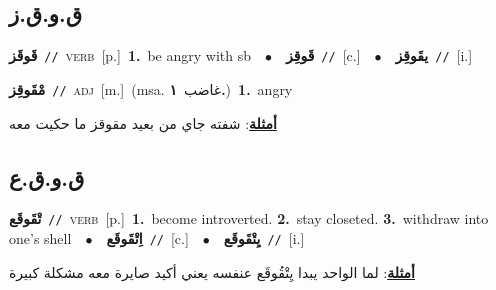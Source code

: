 \documentclass[10pt,a4paper,twoside]{article} %
\begin{document}
\begin{multicols}{2}
\vspace{-3mm}
\subsection*{\color{blue}\foreignlanguage{arabic}{ق.و.ق.ز}\color{blue}{}} 

{\setlength\topsep{0pt}\textbf{\foreignlanguage{arabic}{قَوقَز}}\ {\color{gray}\texttt{//}\color{black}}\ \textsc{verb}\ [p.]\ \textbf{1.}~be angry with sb\ \ $\bullet$\ \ \setlength\topsep{0pt}\textbf{\foreignlanguage{arabic}{قَوقِز}}\ {\color{gray}\texttt{//}\color{black}}\ [c.]\ \ $\bullet$\ \ \setlength\topsep{0pt}\textbf{\foreignlanguage{arabic}{يقَوقِز}}\ {\color{gray}\texttt{//}\color{black}}\ [i.]\ } \vspace{2mm}

{\setlength\topsep{0pt}\textbf{\foreignlanguage{arabic}{مْقَوقِز}}\ {\color{gray}\texttt{//}\color{black}}\ \textsc{adj}\ [m.]\ \color{gray}(msa. \foreignlanguage{arabic}{غاضب}~\foreignlanguage{arabic}{\textbf{١.}})\color{black}\ \textbf{1.}~angry\  \begin{flushright}\color{gray}\foreignlanguage{arabic}{\textbf{\underline{\foreignlanguage{arabic}{أمثلة}}}: شفته جاي من بعيد مقوقز ما حكيت معه}\end{flushright}\color{black}} \vspace{2mm}

\vspace{-3mm}
\subsection*{\color{blue}\foreignlanguage{arabic}{ق.و.ق.ع}\color{blue}{}} 

{\setlength\topsep{0pt}\textbf{\foreignlanguage{arabic}{تْقَوقَع}}\ {\color{gray}\texttt{//}\color{black}}\ \textsc{verb}\ [p.]\ \textbf{1.}~become introverted.  \textbf{2.}~stay closeted.  \textbf{3.}~withdraw into one's shell\ \ $\bullet$\ \ \setlength\topsep{0pt}\textbf{\foreignlanguage{arabic}{اِتْقَوقَع}}\ {\color{gray}\texttt{//}\color{black}}\ [c.]\ \ $\bullet$\ \ \setlength\topsep{0pt}\textbf{\foreignlanguage{arabic}{يِتْقَوقَع}}\ {\color{gray}\texttt{//}\color{black}}\ [i.]\  \begin{flushright}\color{gray}\foreignlanguage{arabic}{\textbf{\underline{\foreignlanguage{arabic}{أمثلة}}}: لما الواحد يبدا يِتْقُوقَع عنفسه يعني أكيد صايرة معه مشكلة كبيرة}\end{flushright}\color{black}} \vspace{2mm}


\end{multicols}
\end{document}

